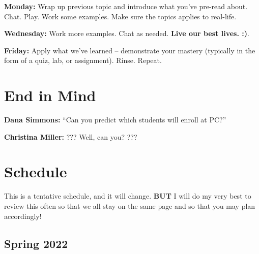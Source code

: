 \documentclass[
]{book}
\theoremstyle{definition}
\theoremstyle{definition}
\theoremstyle{definition}
\theoremstyle{definition}
\theoremstyle{remark}
\begin{document}
\textbf{Monday:} Wrap up previous topic and introduce what you've pre-read about. Chat. Play. Work some examples. Make sure the topics applies to real-life.

\textbf{Wednesday:} Work more examples. Chat as needed. \textbf{Live our best lives. :)}.

\textbf{Friday:} Apply what we've learned -- demonstrate your mastery (typically in the form of a quiz, lab, or assignment). Rinse. Repeat.

\hypertarget{end-in-mind}{%
\chapter{End in Mind}\label{end-in-mind}}

\textbf{Dana Simmons:} ``Can you predict which students will enroll at PC?''

\textbf{Christina Miller:} ??? Well, can you? ???

\hypertarget{schedule}{%
\chapter{Schedule}\label{schedule}}

This is a tentative schedule, and it will change. \textbf{BUT} I will do my very best to review this often so that we all stay on the same page and so that you may plan accordingly!

\hypertarget{spring-2022}{%
\section*{Spring 2022}\label{spring-2022}}
\end{document}
